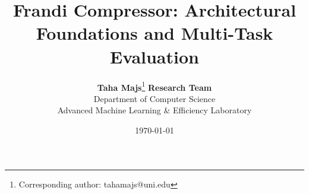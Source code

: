 \title{\textbf{Frandi Compressor: Architectural Foundations and Multi-Task Evaluation}}

\author{
  \textbf{Taha Majs}\thanks{Corresponding author: tahamajs@uni.edu} \quad \textbf{Research Team} \\
  Department of Computer Science \\
  Advanced Machine Learning \& Efficiency Laboratory
}

\date{\today}
